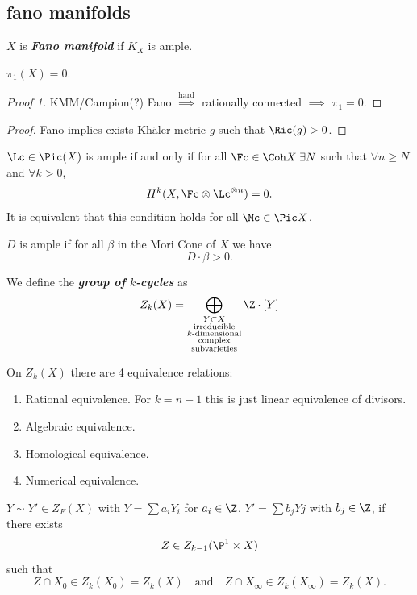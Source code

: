 \subsection{fano manifolds}
\begin{defn}
	$X$ is \textbf{\textit{Fano manifold}} if $K_X$ is ample.
\end{defn}
\begin{thm}
	$\pi_1(X)=0$.
\end{thm}
\begin{proof}[Proof 1]
	KMM/Campion(?) Fano $\overset{\text{hard}}{\implies}$ rationally connected $\implies$ $\pi_1=0$.
\end{proof}
\begin{proof}[Proof]
	Fano implies exists Khäler metric $g$ such that $\Ric(g)>0$.
\end{proof}
\begin{thm}
	$\Lc\in\Pic(X)$ is ample if and only if for all $\Fc\in\Coh X\;\exists N$ such that $\forall n\geq N$ and $\forall k>0$,
	\[H^k(X,\Fc\otimes\Lc^{\otimes n})=0.\]
	It is equivalent that this condition holds for all $\Mc\in\Pic X$.
\end{thm}
\begin{thm}
	$D$ is ample if for all $\beta$ in the Mori Cone of $X$ we have
	\[D\cdot\beta>0.\]
\end{thm}
\begin{defn}
	We define the \textbf{\textit{group of $k$-cycles}} as
	\[Z_k(X)=\bigoplus_{\substack{Y\subset X\\\text{irreducible}\\k\text{-dimensional}\\\text{complex}\\\text{subvarieties}}}\Z\cdot[Y]\]
\end{defn}
\begin{remark}
	On $Z_k(X)$ there are 4 equivalence relations:
	\begin{enumerate}
		\item Rational equivalence. For $k=n-1$ this is just linear equivalence of divisors.
		\item Algebraic equivalence.
		\item Homological equivalence.
		\item Numerical equivalence.
	\end{enumerate}
\end{remark}
\begin{defn}
	$Y\sim Y'\in Z_F(X)$ with $Y=\sum a_iY_i$ for $a_i\in\Z$, $Y'=\sum b_jYj$ with $b_j\in\Z$, if there exists
	\[Z\in Z_{k-1}(\P^1\times X)\]
	such that
	\[Z\cap X_0\in Z_k(X_0)=Z_k(X)\quad\text{and}\quad Z\cap X_\infty\in Z_k(X_\infty)=Z_k(X).\]
\end{defn}
